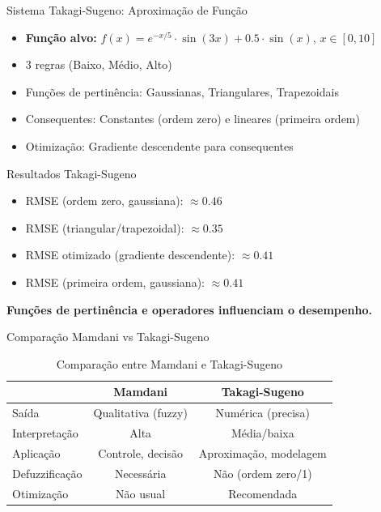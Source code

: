 \documentclass[aspectratio=169]{beamer}
\begin{document}
\begin{frame}{Sistema Takagi-Sugeno: Aproximação de Função}
    \begin{itemize}
        \item \textbf{Função alvo:} \(f(x) = e^{-x/5} \cdot \sin(3x) + 0.5 \cdot \sin(x)\), \(x \in [0, 10]\)
        \item 3 regras (Baixo, Médio, Alto)
        \item Funções de pertinência: Gaussianas, Triangulares, Trapezoidais
        \item Consequentes: Constantes (ordem zero) e lineares (primeira ordem)
        \item Otimização: Gradiente descendente para consequentes
    \end{itemize}
\end{frame}

\begin{frame}{Resultados Takagi-Sugeno}
    \begin{itemize}
        \item RMSE (ordem zero, gaussiana): \(\approx 0.46\)
        \item RMSE (triangular/trapezoidal): \(\approx 0.35\)
        \item RMSE otimizado (gradiente descendente): \(\approx 0.41\)
        \item RMSE (primeira ordem, gaussiana): \(\approx 0.41\)
    \end{itemize}
    \vspace{0.5em}
    \textbf{Funções de pertinência e operadores influenciam o desempenho.}
\end{frame}

\begin{frame}{Comparação Mamdani vs Takagi-Sugeno}
    \begin{table}
    \centering
    \caption{Comparação entre Mamdani e Takagi-Sugeno}
    \begin{tabular}{@{}lcc@{}}
    \toprule
    & \textbf{Mamdani} & \textbf{Takagi-Sugeno} \\
    \midrule
    Saída & Qualitativa (fuzzy) & Numérica (precisa) \\
    Interpretação & Alta & Média/baixa \\
    Aplicação & Controle, decisão & Aproximação, modelagem \\
    Defuzzificação & Necessária & Não (ordem zero/1) \\
    Otimização & Não usual & Recomendada \\
    \bottomrule
    \end{tabular}
    \end{table}
\end{frame}
\end{document}
